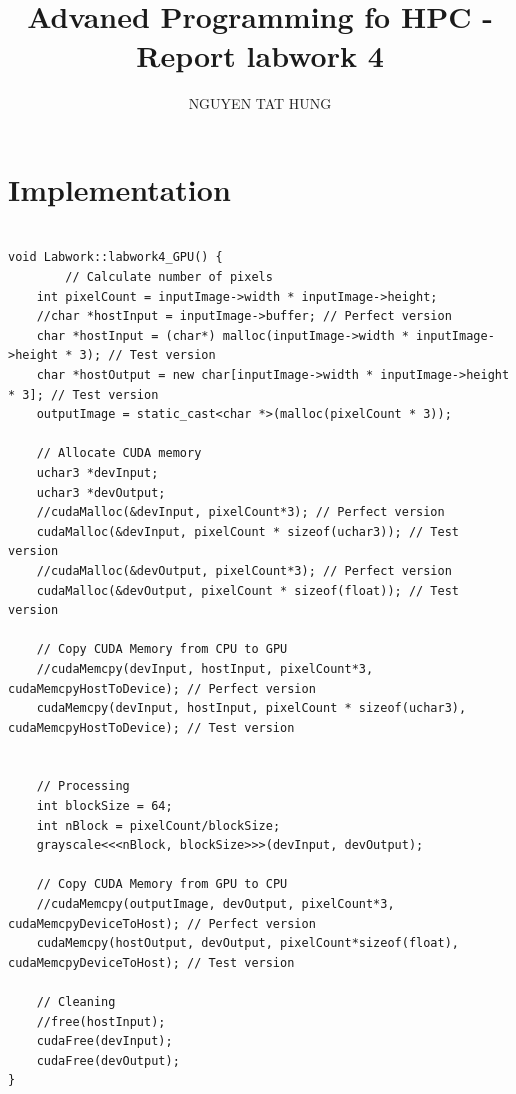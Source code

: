 \documentclass{article}
\title{Advaned Programming fo HPC - Report labwork 4}
\author{NGUYEN TAT HUNG}
\begin{document}
\maketitle

\section*{Implementation}
\begin{lstlisting}

void Labwork::labwork4_GPU() {
        // Calculate number of pixels
    int pixelCount = inputImage->width * inputImage->height;
    //char *hostInput = inputImage->buffer; // Perfect version
    char *hostInput = (char*) malloc(inputImage->width * inputImage->height * 3); // Test version
    char *hostOutput = new char[inputImage->width * inputImage->height * 3]; // Test version
    outputImage = static_cast<char *>(malloc(pixelCount * 3));

    // Allocate CUDA memory
    uchar3 *devInput;
    uchar3 *devOutput;
    //cudaMalloc(&devInput, pixelCount*3); // Perfect version
    cudaMalloc(&devInput, pixelCount * sizeof(uchar3)); // Test version
    //cudaMalloc(&devOutput, pixelCount*3); // Perfect version
    cudaMalloc(&devOutput, pixelCount * sizeof(float)); // Test version
    
    // Copy CUDA Memory from CPU to GPU
    //cudaMemcpy(devInput, hostInput, pixelCount*3, cudaMemcpyHostToDevice); // Perfect version
    cudaMemcpy(devInput, hostInput, pixelCount * sizeof(uchar3), cudaMemcpyHostToDevice); // Test version


    // Processing
    int blockSize = 64;
    int nBlock = pixelCount/blockSize;
    grayscale<<<nBlock, blockSize>>>(devInput, devOutput);

    // Copy CUDA Memory from GPU to CPU
    //cudaMemcpy(outputImage, devOutput, pixelCount*3, cudaMemcpyDeviceToHost); // Perfect version
    cudaMemcpy(hostOutput, devOutput, pixelCount*sizeof(float), cudaMemcpyDeviceToHost); // Test version

    // Cleaning
    //free(hostInput);
    cudaFree(devInput);
    cudaFree(devOutput);
}

\end{lstlisting}
\end{document}
